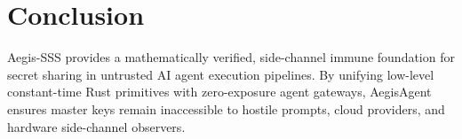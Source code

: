 \documentclass[11pt,a4paper]{article}
\begin{document}
\section{Conclusion}
Aegis-SSS provides a mathematically verified, side-channel immune foundation for secret sharing in untrusted AI agent execution pipelines. By unifying low-level constant-time Rust primitives with zero-exposure agent gateways, AegisAgent ensures master keys remain inaccessible to hostile prompts, cloud providers, and hardware side-channel observers.
\end{document}
